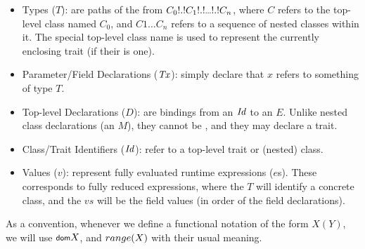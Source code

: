 \begin{itemize}
	\item Types ($T$): are paths of the from $C_0\.C_1\.\ldots\.C_n$, where $C$ refers to the top-level class named $C_0$, and $C1 \ldots C_n$ refers to a sequence of nested classes within it. The special top-level class name \This is used to represent the currently enclosing trait (if their is one). 

	\item Parameter/Field Declarations ($\mathit{Tx}$): simply declare that $x$ refers to something of type $T$.
	
	\item Top-level Declarations ($D$):  are bindings from an $\mathit{Id}$ to an $E$. Unlike nested class declarations (an $M$), they cannot be , and they may declare a trait. 

	\item Class/Trait Identifiers ($\mathit{Id}$): refer to a top-level trait or (nested) class.
	
	\item Values ($v$): represent fully evaluated runtime expressions ($e$s). These corresponds to fully reduced  expressions, where the $T$ will identify a concrete class, and the $vs$ will be the field values (in order of the field declarations).	
\end{itemize}

As a convention, whenever we define a functional notation of the form $X(Y)$, we will use $\dom{X}$, and ${\footnotesize{{range}}({X})}$ with their usual meaning.

